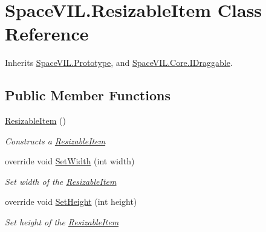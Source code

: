 \hypertarget{class_space_v_i_l_1_1_resizable_item}{}\section{Space\+V\+I\+L.\+Resizable\+Item Class Reference}
\label{class_space_v_i_l_1_1_resizable_item}


Inherits \mbox{\hyperlink{class_space_v_i_l_1_1_prototype}{Space\+V\+I\+L.\+Prototype}}, and \mbox{\hyperlink{interface_space_v_i_l_1_1_core_1_1_i_draggable}{Space\+V\+I\+L.\+Core.\+I\+Draggable}}.

\subsection*{Public Member Functions}
\begin{DoxyCompactItemize}
\item 
\mbox{\hyperlink{class_space_v_i_l_1_1_resizable_item_aa953ea18fb705e9cfe7da688f10530b2}{Resizable\+Item}} ()
\begin{DoxyCompactList}\small\item\em Constructs a \mbox{\hyperlink{class_space_v_i_l_1_1_resizable_item}{Resizable\+Item}} \end{DoxyCompactList}\item 
override void \mbox{\hyperlink{class_space_v_i_l_1_1_resizable_item_a7f12553e7547d5ef653be8719e9cfee4}{Set\+Width}} (int width)
\begin{DoxyCompactList}\small\item\em Set width of the \mbox{\hyperlink{class_space_v_i_l_1_1_resizable_item}{Resizable\+Item}} \end{DoxyCompactList}\item 
override void \mbox{\hyperlink{class_space_v_i_l_1_1_resizable_item_a9ffdafec963a452576589d3efc452356}{Set\+Height}} (int height)
\begin{DoxyCompactList}\small\item\em Set height of the \mbox{\hyperlink{class_space_v_i_l_1_1_resizable_item}{Resizable\+Item}} \end{DoxyCompactList}\end{DoxyCompactItemize}
